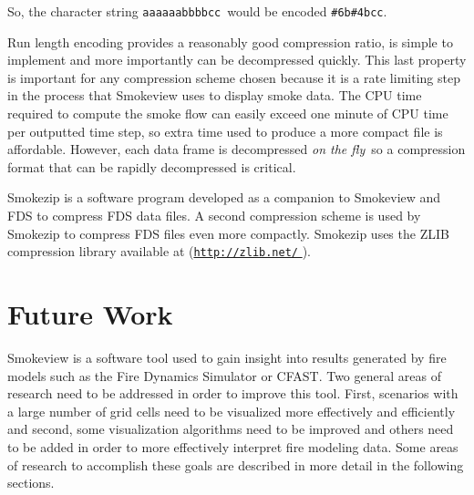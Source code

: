 \documentclass[11pt,twoside]{book}
\newcommand{\hhref}[1]{\href{#1}{{\tt #1}
}}
\begin{document}
So, the character string {\tt aaaaaabbbbcc}\ would be encoded {\tt \#6b\#4bcc}.

Run length encoding provides a reasonably good compression ratio, is simple to implement and more importantly can be decompressed quickly.
This last property is important for any compression scheme chosen because it is a rate limiting step in the process that Smokeview uses to display smoke data.
The CPU time required to compute the
smoke flow can easily exceed one minute of CPU time per outputted
time step, so extra time used to produce a more compact file is
affordable. However, each data frame is decompressed {\em on the
fly}\ so a compression format that can be rapidly decompressed is
critical.

Smokezip is a software program developed as a companion to Smokeview and FDS to compress FDS data files.
A second compression scheme is used by Smokezip to compress FDS files even more compactly.  Smokezip uses the ZLIB compression library available at (\hhref{http://zlib.net/}).

%
%

\chapter{Future Work}

Smokeview is a software tool used to gain insight into results generated
by fire models such as the Fire Dynamics Simulator or CFAST.
Two general areas of research need to be addressed in order to improve this tool. First, scenarios with a large number of grid cells need to be visualized more effectively and efficiently and second, some visualization algorithms need to be improved and others need to be added in order to more effectively interpret fire modeling data.
Some areas of research to accomplish these goals are described in more detail in the following sections.
\end{document}
